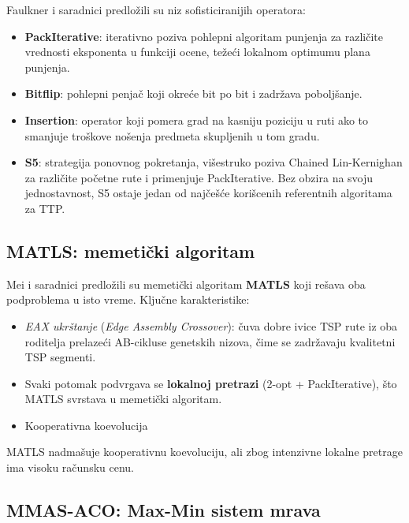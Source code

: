\documentclass[12pt,a4paper]{article}
\begin{document}
Faulkner i saradnici \cite{faulkner2015} predlo\v{z}ili su niz sofisticiranijih operatora:
\begin{itemize}
    \item \textbf{PackIterative}: iterativno poziva pohlepni algoritam punjenja za razli\v{c}ite vrednosti eksponenta u funkciji ocene, te\v{z}e\'{c}i lokalnom optimumu plana punjenja.
    \item \textbf{Bitflip}: pohlepni penja\v{c} koji okre\'{c}e bit po bit i zadr\v{z}ava poboljšanje.
    \item \textbf{Insertion}: operator koji pomera grad na kasniju poziciju u ruti ako to smanjuje troškove no\v{s}enja predmeta skupljenih u tom gradu.
    \item \textbf{S5}: strategija ponovnog pokretanja, vi\v{s}estruko poziva Chained Lin-Kernighan za razli\v{c}ite po\v{c}etne rute i primenjuje PackIterative. Bez obzira na svoju jednostavnost, S5 ostaje jedan od naj\v{c}e\v{s}\'{c}e kori\v{s}cenih referentnih algoritama za TTP.
\end{itemize}

\subsection{MATLS: memetički algoritam}

Mei i saradnici \cite{mei2014} predlo\v{z}ili su memetički algoritam \textbf{MATLS} koji re\v{s}ava oba podproblema u isto vreme. Klju\v{c}ne karakteristike:
\begin{itemize}
    \item \textit{EAX ukrštanje} (\textit{Edge Assembly Crossover}): \v{c}uva dobre ivice TSP rute iz oba roditelja prelazeći AB-cikluse genetskih nizova, \v{c}ime se zadr\v{z}avaju kvalitetni TSP segmenti.
    \item Svaki potomak podvrgava se \textbf{lokalnoj pretrazi} (2-opt + PackIterative), što MATLS svrstava u memetički algoritam.
    \item Kooperativna koevolucija
\end{itemize}
MATLS nadma\v{s}uje kooperativnu koevoluciju, ali zbog intenzivne lokalne pretrage ima visoku ra\v{c}unsku cenu.

\subsection{MMAS-ACO: Max-Min sistem mrava}
\end{document}
